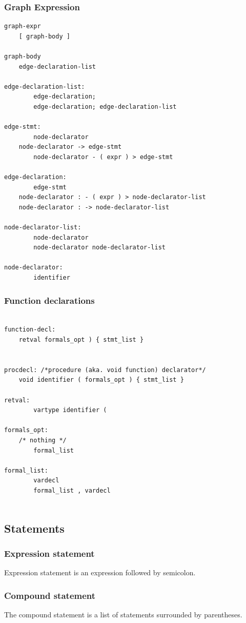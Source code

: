 \documentclass[a4paper,12pt]{article}
\begin{document}
\subsubsection{Graph Expression}
\begin{lstlisting}
graph-expr
	[ graph-body ]
		
graph-body
	edge-declaration-list

edge-declaration-list:
     	edge-declaration;
    	edge-declaration; edge-declaration-list 
 
edge-stmt:
     	node-declarator 
   	node-declarator -> edge-stmt 
    	node-declarator - ( expr ) > edge-stmt 
 
edge-declaration:
     	edge-stmt 
   	node-declarator : - ( expr ) > node-declarator-list  
   	node-declarator : -> node-declarator-list  
 
node-declarator-list:
     	node-declarator 
     	node-declarator node-declarator-list    
 
node-declarator:
     	identifier

\end{lstlisting}

\subsubsection{Function declarations}
\begin{lstlisting}

function-decl:
 	retval formals_opt ) { stmt_list }

  
procdecl: /*procedure (aka. void function) declarator*/
   	void identifier ( formals_opt ) { stmt_list }
  
retval:
      	vartype identifier (
 
formals_opt:
	/* nothing */ 
    	formal_list 
  
formal_list:
      	vardecl
    	formal_list , vardecl 
 
\end{lstlisting}		

\subsection{Statements}
\subsubsection{Expression statement}
Expression statement is an expression followed by semicolon.
\subsubsection{Compound statement}
The compound statement is a list of statements surrounded by parentheses.
\end{document}

